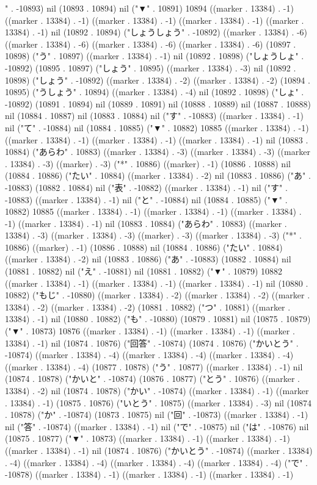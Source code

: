 " . -10893) nil (10893 . 10894) nil ("▼" . 10891) 10894 ((marker . 13384) . -1) ((marker . 13384) . -1) ((marker . 13384) . -1) ((marker . 13384) . -1) ((marker . 13384) . -1) nil (10892 . 10894) ("しょうしょう" . -10892) ((marker . 13384) . -6) ((marker . 13384) . -6) ((marker . 13384) . -6) ((marker . 13384) . -6) (10897 . 10898) ("う" . 10897) ((marker . 13384) . -1) nil (10892 . 10898) ("しょうしょ" . -10892) (10895 . 10897) ("しょう" . 10895) ((marker . 13384) . -3) nil (10892 . 10898) ("しょう" . -10892) ((marker . 13384) . -2) ((marker . 13384) . -2) (10894 . 10895) ("うしょう" . 10894) ((marker . 13384) . -4) nil (10892 . 10898) ("しょ" . -10892) (10891 . 10894) nil (10889 . 10891) nil (10888 . 10889) nil (10887 . 10888) nil (10884 . 10887) nil (10883 . 10884) nil ("す" . -10883) ((marker . 13384) . -1) nil ("て" . -10884) nil (10884 . 10885) ("▼" . 10882) 10885 ((marker . 13384) . -1) ((marker . 13384) . -1) ((marker . 13384) . -1) ((marker . 13384) . -1) nil (10883 . 10884) ("あらわ" . 10883) ((marker . 13384) . -3) ((marker . 13384) . -3) ((marker . 13384) . -3) ((marker) . -3) ("*" . 10886) ((marker) . -1) (10886 . 10888) nil (10884 . 10886) ("たい" . 10884) ((marker . 13384) . -2) nil (10883 . 10886) ("あ" . -10883) (10882 . 10884) nil ("表" . -10882) ((marker . 13384) . -1) nil ("す" . -10883) ((marker . 13384) . -1) nil ("と" . -10884) nil (10884 . 10885) ("▼" . 10882) 10885 ((marker . 13384) . -1) ((marker . 13384) . -1) ((marker . 13384) . -1) ((marker . 13384) . -1) nil (10883 . 10884) ("あらわ" . 10883) ((marker . 13384) . -3) ((marker . 13384) . -3) ((marker) . -3) ((marker . 13384) . -3) ("*" . 10886) ((marker) . -1) (10886 . 10888) nil (10884 . 10886) ("たい" . 10884) ((marker . 13384) . -2) nil (10883 . 10886) ("あ" . -10883) (10882 . 10884) nil (10881 . 10882) nil ("え" . -10881) nil (10881 . 10882) ("▼" . 10879) 10882 ((marker . 13384) . -1) ((marker . 13384) . -1) ((marker . 13384) . -1) nil (10880 . 10882) ("もじ" . -10880) ((marker . 13384) . -2) ((marker . 13384) . -2) ((marker . 13384) . -2) ((marker . 13384) . -2) (10881 . 10882) ("つ" . 10881) ((marker . 13384) . -1) nil (10880 . 10882) ("も" . -10880) (10879 . 10881) nil (10875 . 10879) ("▼" . 10873) 10876 ((marker . 13384) . -1) ((marker . 13384) . -1) ((marker . 13384) . -1) nil (10874 . 10876) ("回答" . -10874) (10874 . 10876) ("かいとう" . -10874) ((marker . 13384) . -4) ((marker . 13384) . -4) ((marker . 13384) . -4) ((marker . 13384) . -4) (10877 . 10878) ("う" . 10877) ((marker . 13384) . -1) nil (10874 . 10878) ("かいと" . -10874) (10876 . 10877) ("とう" . 10876) ((marker . 13384) . -2) nil (10874 . 10878) ("かい" . -10874) ((marker . 13384) . -1) ((marker . 13384) . -1) (10875 . 10876) ("いとう" . 10875) ((marker . 13384) . -3) nil (10874 . 10878) ("か" . -10874) (10873 . 10875) nil ("回" . -10873) ((marker . 13384) . -1) nil ("答" . -10874) ((marker . 13384) . -1) nil ("で" . -10875) nil ("は" . -10876) nil (10875 . 10877) ("▼" . 10873) ((marker . 13384) . -1) ((marker . 13384) . -1) ((marker . 13384) . -1) nil (10874 . 10876) ("かいとう" . -10874) ((marker . 13384) . -4) ((marker . 13384) . -4) ((marker . 13384) . -4) ((marker . 13384) . -4) ("で" . -10878) ((marker . 13384) . -1) ((marker . 13384) . -1) ((marker . 13384) . -1) 